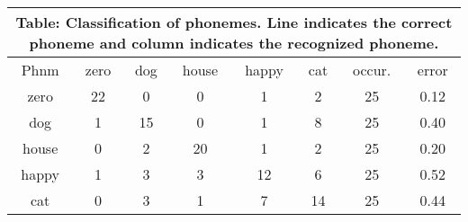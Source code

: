 \documentclass[10pt]{article}
\begin{document}
\tiny
\begin{tabular}{|@{}c@{}||@{}c@{}|@{}c@{}|@{}c@{}|@{}c@{}|@{}c@{}|@{}c@{}|@{}c@{}|}
\hline
\multicolumn{8}{c}{Table: Classification of phonemes. Line indicates the correct phoneme and column indicates the recognized phoneme.} \\ \hline \hline
Phnm & zero & dog & house & happy & cat & occur. & error \\ \hline
zero & 22 & 0 & 0 & 1 & 2 & 25 & 0.12 \\ \hline
dog & 1 & 15 & 0 & 1 & 8 & 25 & 0.40 \\ \hline
house & 0 & 2 & 20 & 1 & 2 & 25 & 0.20 \\ \hline
happy & 1 & 3 & 3 & 12 & 6 & 25 & 0.52 \\ \hline
cat & 0 & 3 & 1 & 7 & 14 & 25 & 0.44 \\ \hline
\end{tabular}
\end{document}
